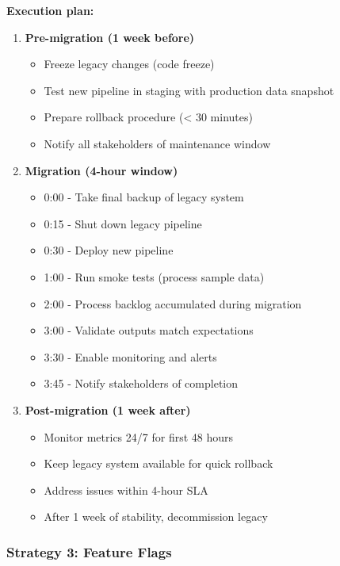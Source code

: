 \textbf{Execution plan:}
\begin{enumerate}
    \item \textbf{Pre-migration (1 week before)}
        \begin{itemize}
            \item Freeze legacy changes (code freeze)
            \item Test new pipeline in staging with production data snapshot
            \item Prepare rollback procedure (< 30 minutes)
            \item Notify all stakeholders of maintenance window
        \end{itemize}

    \item \textbf{Migration (4-hour window)}
        \begin{itemize}
            \item 0:00 - Take final backup of legacy system
            \item 0:15 - Shut down legacy pipeline
            \item 0:30 - Deploy new pipeline
            \item 1:00 - Run smoke tests (process sample data)
            \item 2:00 - Process backlog accumulated during migration
            \item 3:00 - Validate outputs match expectations
            \item 3:30 - Enable monitoring and alerts
            \item 3:45 - Notify stakeholders of completion
        \end{itemize}

    \item \textbf{Post-migration (1 week after)}
        \begin{itemize}
            \item Monitor metrics 24/7 for first 48 hours
            \item Keep legacy system available for quick rollback
            \item Address issues within 4-hour SLA
            \item After 1 week of stability, decommission legacy
        \end{itemize}
\end{enumerate}

\subsubsection{Strategy 3: Feature Flags}

